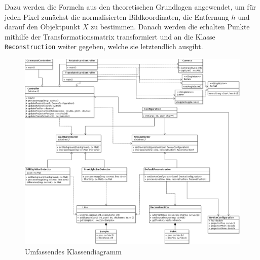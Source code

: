 \documentclass[ngerman,a4paper,parskip=half]{scrartcl}
\begin{document}
Dazu werden die Formeln aus den theoretischen Grundlagen angewendet, um für jeden Pixel zunächst die normalisierten Bildkoordinaten, die Entfernung $h$ und darauf den Objektpunkt $X$ zu bestimmen. Danach werden die erhalten Punkte mithilfe der Transformationsmatrix transformiert und an die Klasse \texttt{Reconstruction} weiter gegeben, welche sie letztendlich ausgibt.


\begin{figure}[p]
	\centering
	\includegraphics[width=\linewidth]{includes/classdiagram}
	\caption{Umfassendes Klassendiagramm}
	\label{fig:classes_all}
\end{figure}
	
\end{document}
